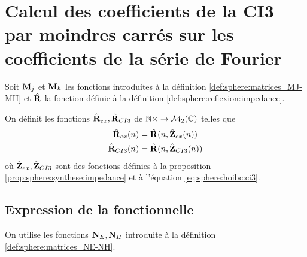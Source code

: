 \section{Calcul des coefficients de la CI3 par moindres carrés sur les coefficients de la série de Fourier}

  Soit \(\mathbf{M}_j\) et \(\mathbf{M}_h\) les fonctions introduites à la définition \ref{def:sphere:matrices_MJ-MH} et \(\hat{\mathbf{R}}\) la fonction définie à la définition \ref{def:sphere:reflexion:impedance}.

  \begin{defn}%
    \label{def:sphere:minimisation:matrices_MR}
    On définit les fonctions \(\hat{\mathbf{R}}_{ex}, \hat{\mathbf{R}}_{CI3}\) de \(\mathbb N\times \rightarrow \mathcal{M}_2(\mathbb C)\) telles que
    \begin{align*}
      \hat{\mathbf{R}}_{ex}(n) &= \hat{\mathbf{R}}(n, \hat{\mathbf{Z}}_{ex}(n))
      \\
      \hat{\mathbf{R}}_{CI3}(n) &= \hat{\mathbf{R}}(n, \hat{\mathbf{Z}}_{CI3}(n))
    \end{align*}
    où \(\hat{\mathbf{Z}}_{ex},\hat{\mathbf{Z}}_{CI3}\) sont des fonctions définies à la proposition \ref{prop:sphere:synthese:impedance} et à l'équation \eqref{eq:sphere:hoibc:ci3}.
  \end{defn}

  \subsection{Expression de la fonctionnelle}

    On utilise les fonctions \(\mathbf{N}_E, \mathbf{N}_H\) introduite à la définition \ref{def:sphere:matrices_NE-NH}.

